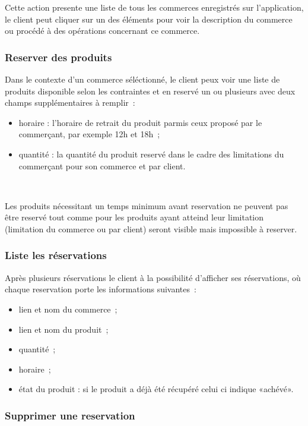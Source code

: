 \documentclass[a4paper,12pt]{article}
\begin{document}
Cette action presente une liste de tous les commerces enregistrés sur l'application, le client peut cliquer sur un des éléments pour voir la description du commerce ou procédé à des opérations concernant ce commerce.

\subsubsection{Reserver des produits}

Dans le contexte d'un commerce séléctionné, le client peux voir une liste de produits disponible selon les contraintes et en reservé un ou plusieurs avec deux champs supplémentaires à remplir~:

\begin{itemize}
	\item horaire : l'horaire de retrait du produit parmis ceux proposé par le commerçant, par exemple 12h et 18h~;
	\item quantité : la quantité du produit reservé dans le cadre des limitations du commerçant pour son commerce et par client.
\end{itemize} \

Les produits nécessitant un temps minimum avant reservation ne peuvent pas être reservé tout comme pour les produits ayant atteind leur limitation (limitation du commerce ou par client) seront visible mais impossible à reserver.

\subsubsection{Liste les réservations}

Après plusieurs réservations le client à la possibilité d'afficher ses réservations, où chaque reservation porte les informations suivantes~:

\begin{itemize}
	\item lien et nom du commerce~;
	\item lien et nom du produit~;
	\item quantité~;
	\item horaire~;
	\item état du produit : si le produit a déjà été récupéré celui ci indique «achévé».
\end{itemize}


\subsubsection{Supprimer une reservation}
\end{document}
